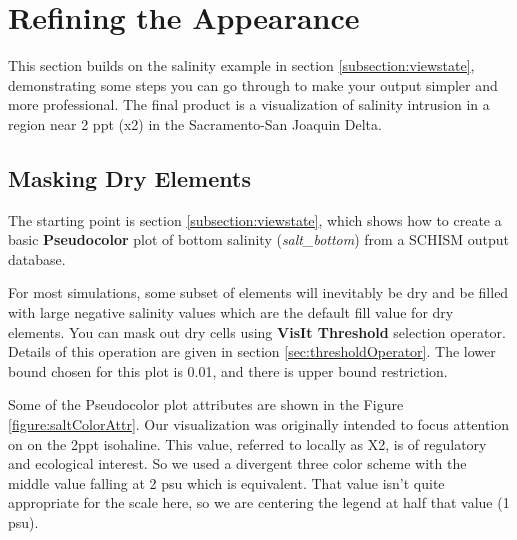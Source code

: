 \documentclass[12pt]{report}
\begin{document}
			
\section{Refining the Appearance}
			
This section builds on the salinity example in section \ref{subsection:viewstate},
demonstrating some steps you can go through to make your output 
simpler and more professional. The final product is a visualization of salinity
intrusion in a region near 2 ppt (x2) in the Sacramento-San Joaquin Delta. 
			
\subsection{Masking Dry Elements}
The starting point is section \ref{subsection:viewstate}, which shows how to create a basic 
{\bf Pseudocolor} plot of bottom salinity (\emph{salt\_bottom}) from a SCHISM output database.
	
For most simulations, some subset of elements will inevitably be dry and be filled with large 
negative salinity values which are the default fill value for dry elements. You can mask out 
dry cells using {\bf VisIt Threshold} selection operator. Details of this operation are given in section \ref{sec:thresholdOperator}. The lower bound chosen for this plot is 0.01, and there is upper bound restriction.
			
Some of the Pseudocolor plot attributes are shown in the Figure \ref{figure:saltColorAttr}. Our 
visualization was originally intended to focus attention on on the 2ppt isohaline. This value,
referred to locally as X2, is of regulatory and ecological interest. So we used a divergent three color scheme
with the middle value falling at 2 psu which is equivalent. That value isn't quite appropriate for the scale here, so we
are centering the legend at half that value (1 psu).
	
\end{document}
